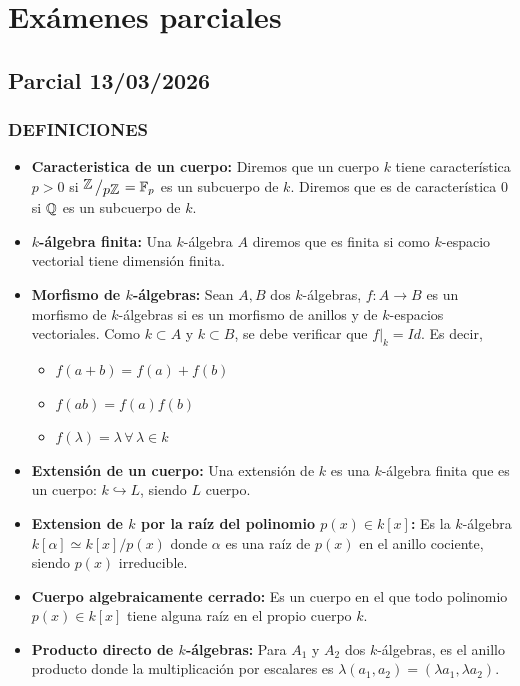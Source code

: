 
\chapter{Ex\'amenes parciales}
\section{Parcial 13/03/2026}
\subsection*{DEFINICIONES}
\begin{itemize}
    \item \textbf{Caracteristica de un cuerpo:} Diremos que un cuerpo $k$ tiene caracter\'istica $p>0$ si $\modulo{\bb Z}{p \bb Z} = \bb F_p$ es un subcuerpo de $k$. Diremos que es de caracter\'istica 0 si $\mathbb{Q}$ es un subcuerpo de $k$.
    \item \textbf{$k$-\'algebra finita:} Una $k$-\'algebra $A$ diremos que es finita si como $k$-espacio vectorial tiene dimensi\'on finita.
    \item \textbf{Morfismo de $k$-\'algebras:} Sean $A, B$ dos $k$-\'algebras, $f: A \longrightarrow B$ es un morfismo de $k$-\'algebras si es un morfismo de anillos y de $k$-espacios vectoriales. Como $k \subset A$ y $k \subset B$, se debe verificar que $f|_k = Id$. Es decir, 
    \begin{itemize}
        \item $f(a+b) = f(a) +f(b) $
        \item $f(ab) = f(a)f(b)$
        \item $f(\lambda) = \lambda\, \forall \, \lambda \in k$ 
    \end{itemize}
    \item \textbf{Extensi\'on de un cuerpo:} Una extensi\'on de $k$ es una $k$-\'algebra finita que es un cuerpo: $k \hookrightarrow L$, siendo $L$ cuerpo. 
    \item \textbf{Extension de $k$ por la ra\'iz del polinomio $p(x) \in k[x]$:} Es la $k$-álgebra $k[\alpha] \simeq k[x]/p(x)$ donde $\alpha$ es una raíz de $p(x)$ en el anillo cociente, siendo $p(x)$ irreducible.
    \item \textbf{Cuerpo algebraicamente cerrado:} Es un cuerpo en el que todo polinomio $p(x) \in k[x]$ tiene alguna raíz en el propio cuerpo $k$.
    \item \textbf{Producto directo de $k$-\'algebras:} Para $A_1$ y $A_2$ dos $k$-álgebras, es el anillo producto donde la multiplicación por escalares es $\lambda(a_1, a_2) = (\lambda a_1, \lambda a_2)$.

\end{itemize}
